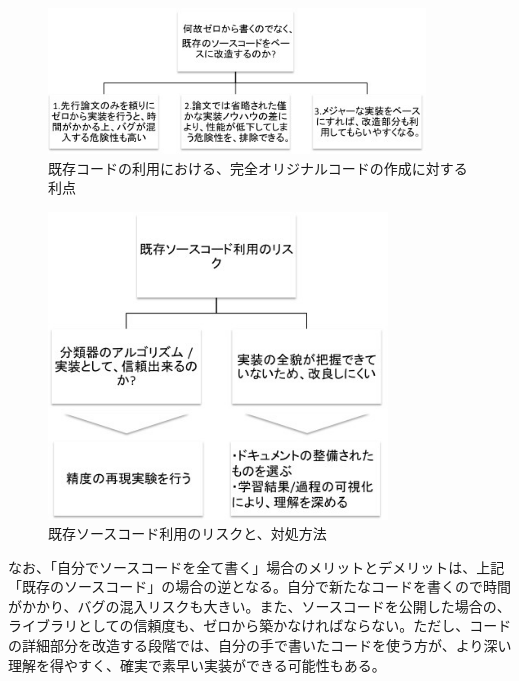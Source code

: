 \begin{figure}[tbp]
 \begin{center}
  \includegraphics[width=100mm]{img/c4/library_merit}
 \end{center}
 \caption{既存コードの利用における、完全オリジナルコードの作成に対する利点}
 \label{c4_library_merit}
\end{figure}

\begin{figure}[tbp]
 \begin{center}
  \includegraphics[width=90mm]{img/c4/library_hedge}
 \end{center}
 \caption{既存ソースコード利用のリスクと、対処方法}
 \label{c4_library_hedge}
\end{figure}

なお、「自分でソースコードを全て書く」場合のメリットとデメリットは、上記「既存のソースコード」の場合の逆となる。自分で新たなコードを書くので時間がかかり、バグの混入リスクも大きい。また、ソースコードを公開した場合の、ライブラリとしての信頼度も、ゼロから築かなければならない。ただし、コードの詳細部分を改造する段階では、自分の手で書いたコードを使う方が、より深い理解を得やすく、確実で素早い実装ができる可能性もある。\par

